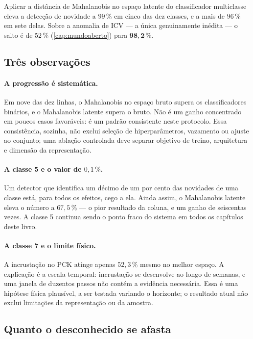 \begin{resultadochave}
Aplicar a distância de Mahalanobis no espaço latente do classificador multiclasse eleva
a detecção de novidade a $99\,\%$ em cinco das dez classes, e a mais de $96\,\%$ em sete
delas. Sobre a anomalia de ICV --- a única genuinamente inédita --- o salto é de
$52\,\%$ (\cref{cap:mundoaberto}) para $\bm{98{,}2\,\%}$.
\end{resultadochave}

\subsection{Três observações}

\paragraph{A progressão é sistemática.} Em nove das dez linhas, o Mahalanobis no espaço
bruto supera os classificadores binários, e o Mahalanobis latente supera o bruto. Não é
um ganho concentrado em poucos casos favoráveis: é um padrão consistente neste
protocolo. Essa consistência, sozinha, não exclui seleção de hiperparâmetros, vazamento ou
ajuste ao conjunto; uma ablação controlada deve separar objetivo de treino, arquitetura
e dimensão da representação.

\paragraph{A classe 5 e o valor de $0{,}1\,\%$.} Um detector que identifica um décimo de
um por cento das novidades de uma classe está, para todos os efeitos, cego a ela. Ainda
assim, o Mahalanobis latente eleva o número a $67{,}5\,\%$ --- o pior resultado da
coluna, e um ganho de seiscentas vezes. A classe 5 continua sendo o ponto fraco do
sistema em todos os capítulos deste livro.

\paragraph{A classe 7 e o limite físico.} A incrustação no PCK atinge apenas $52{,}3\,\%$
mesmo no melhor espaço. A explicação é a escala temporal: incrustação se desenvolve ao
longo de semanas, e uma janela de duzentos passos não contém a evidência necessária.
Essa é uma hipótese física plausível, a ser testada variando o horizonte; o resultado
atual não exclui limitações da representação ou da amostra.

\subsection{Quanto o desconhecido se afasta}

